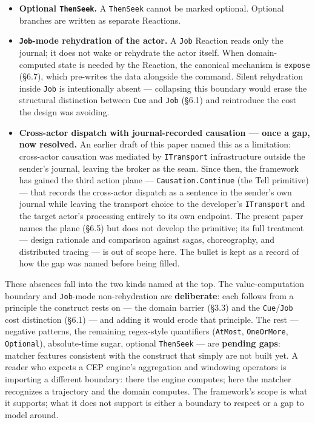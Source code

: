 \documentclass[
]{article}
\let\origtexttt\texttt%
\renewcommand{\texttt}[1]{\origtexttt{\seqsplit{#1}}}%
\let\texttt\origtexttt%
\begin{document}
\begin{itemize}
  \texttt{Where("@Now\ \textgreater{}=\ ...\ \&\&\ @Now\ \textless{}=\ ...")}.
\item
  \textbf{Optional \texttt{ThenSeek}.} A \texttt{ThenSeek} cannot be
  marked optional. Optional branches are written as separate Reactions.
\item
  \textbf{\texttt{Job}-mode rehydration of the actor.} A \texttt{Job}
  Reaction reads only the journal; it does not wake or rehydrate the
  actor itself. When domain-computed state is needed by the Reaction,
  the canonical mechanism is \texttt{expose} (§6.7), which pre-writes
  the data alongside the command. Silent rehydration inside \texttt{Job}
  is intentionally absent --- collapsing this boundary would erase the
  structural distinction between \texttt{Cue} and \texttt{Job} (§6.1)
  and reintroduce the cost the design was avoiding.
\item
  \textbf{Cross-actor dispatch with journal-recorded causation --- once
  a gap, now resolved.} An earlier draft of this paper named this as a
  limitation: cross-actor causation was mediated by \texttt{ITransport}
  infrastructure outside the sender's journal, leaving the broker as the
  seam. Since then, the framework has gained the third action plane ---
  \texttt{Causation.Continue} (the Tell primitive) --- that records the
  cross-actor dispatch as a sentence in the sender's own journal while
  leaving the transport choice to the developer's \texttt{ITransport}
  and the target actor's processing entirely to its own endpoint. The
  present paper names the plane (§6.5) but does not develop the
  primitive; its full treatment --- design rationale and comparison
  against sagas, choreography, and distributed tracing --- is out of
  scope here. The bullet is kept as a record of how the gap was named
  before being filled.
\end{itemize}

These absences fall into the two kinds named at the top. The
value-computation boundary and \texttt{Job}-mode non-rehydration are
\textbf{deliberate}: each follows from a principle the construct rests
on --- the domain barrier (§3.3) and the \texttt{Cue}/\texttt{Job} cost
distinction (§6.1) --- and adding it would erode that principle. The
rest --- negative patterns, the remaining regex-style quantifiers
(\texttt{AtMost}, \texttt{OneOrMore}, \texttt{Optional}), absolute-time
sugar, optional \texttt{ThenSeek} --- are \textbf{pending gaps}: matcher
features consistent with the construct that simply are not built yet. A
reader who expects a CEP engine's aggregation and windowing operators is
importing a different boundary: there the engine computes; here the
matcher recognizes a trajectory and the domain computes. The framework's
scope is what it supports; what it does not support is either a boundary
to respect or a gap to model around.
\end{document}
